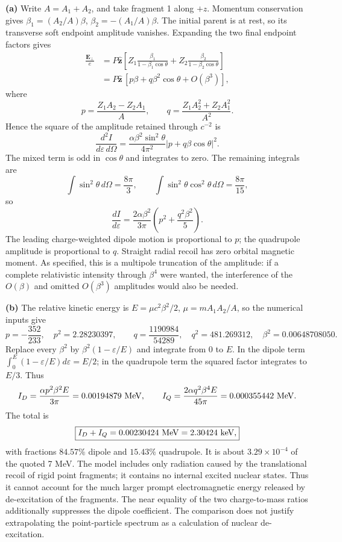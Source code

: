 \medskip\noindent\textbf{(a)} Write $A=A_1+A_2$, and take fragment 1
along $+z$.  Momentum conservation gives
$\beta_1=(A_2/A)\beta$, $\beta_2=-(A_1/A)\beta$.
The initial parent is at rest, so its transverse soft endpoint
amplitude vanishes.  Expanding the two final endpoint factors gives
\begin{align*}
\frac{\mathbf E_\perp}{e}
&=P\widehat{\mathbf z}\left[
 Z_1\frac{\beta_1}{1-\beta_1\cos\theta}
 +Z_2\frac{\beta_2}{1-\beta_2\cos\theta}\right]\\
&=P\widehat{\mathbf z}\,[p\beta+q\beta^2\cos\theta+O(\beta^3)],
\end{align*}
where
\[
p=\frac{Z_1A_2-Z_2A_1}{A},\qquad
q=\frac{Z_1A_2^2+Z_2A_1^2}{A^2}.
\]
Hence the square of the amplitude retained through $c^{-2}$ is
\[
\boxed{\frac{d^2I}{d\varepsilon\,d\Omega}
 =\frac{\alpha\beta^2\sin^2\theta}{4\pi^2}
 |p+q\beta\cos\theta|^2.}
\]
The mixed term is odd in $\cos\theta$ and integrates to zero.
The remaining integrals are
\[
\int\sin^2\theta\,d\Omega=\frac{8\pi}3,\qquad
\int\sin^2\theta\cos^2\theta\,d\Omega=\frac{8\pi}{15},
\]
so
\[
\boxed{\frac{dI}{d\varepsilon}
=\frac{2\alpha\beta^2}{3\pi}
\left(p^2+\frac{q^2\beta^2}5\right).}
\]
The leading charge-weighted dipole motion is proportional to $p$;
the quadrupole amplitude is proportional to $q$.  Straight radial
recoil has zero orbital magnetic moment.  As specified, this is a
multipole truncation of the amplitude: if a complete relativistic
intensity through $\beta^4$ were wanted, the interference of the
$O(\beta)$ and omitted $O(\beta^3)$ amplitudes would also be needed.

\medskip\noindent\textbf{(b)} The relative kinetic energy is
$E=\mu c^2\beta^2/2$, $\mu=mA_1A_2/A$, so the numerical inputs give
\[
p=-\frac{352}{233},\quad p^2=2.28230397,\qquad
q=\frac{1190984}{54289},\quad q^2=481.269312,
\quad \beta^2=0.00648708050.
\]
Replace every $\beta^2$ by $\beta^2(1-\varepsilon/E)$ and integrate
from $0$ to $E$.  In the dipole term
$\int_0^E(1-\varepsilon/E)d\varepsilon=E/2$; in the quadrupole
term the squared factor integrates to $E/3$.  Thus
\[
I_D=\frac{\alpha p^2\beta^2E}{3\pi}=0.00194879\ {\rm MeV},
\qquad
I_Q=\frac{2\alpha q^2\beta^4E}{45\pi}=0.000355442\ {\rm MeV}.
\]
The total is
\[
\boxed{I_D+I_Q=0.00230424\ {\rm MeV}=2.30424\ {\rm keV},}
\]
with fractions $84.57\%$ dipole and $15.43\%$ quadrupole.
It is about $3.29\times10^{-4}$ of the quoted 7 MeV.  The model
includes only radiation caused by the translational recoil of rigid
point fragments; it contains no internal excited nuclear states.
Thus it cannot account for the much larger prompt electromagnetic
energy released by de-excitation of the fragments.  The near equality
of the two charge-to-mass ratios additionally suppresses the dipole
coefficient.  The comparison does not justify extrapolating the
point-particle spectrum as a calculation of nuclear de-excitation.

